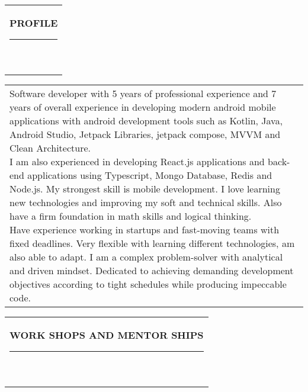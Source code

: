 \documentclass[10pt,A4]{article}
\newcommand{\mpwidth}{\linewidth-\fboxsep-\fboxsep}
\newcommand{\cvtext}[1] {
	\begin{tabular*}{1\mpwidth}{p{0.98\mpwidth}}
		\parbox{1\mpwidth}{#1}
	\end{tabular*}
}
\newcommand{\cvsection}[1] {
	\vspace{14pt}
	\cvtext{
		\textbf{\LARGE{\textcolor{darkcol}{\uppercase{#1}}}}\\[-4pt]
		\textcolor{maincol}{ \rule{0.1\textwidth}{2pt} } \\
	}
}
\begin{document}
\begin{paracol}{2}
\begin{rightcolumn}
\vfill\null
\cvsection{PROFILE}

\cvtext{Software developer with 5 years of professional experience and 7 years of overall experience in developing modern android mobile applications with android development tools such as Kotlin, Java, Android Studio, Jetpack Libraries, jetpack compose, MVVM and Clean Architecture. \\

I am also experienced in developing React.js applications and back-end applications using Typescript, Mongo Database, Redis and Node.js. My strongest skill is mobile development. I love learning new technologies and improving my soft and technical skills. Also have a ﬁrm foundation in math skills and logical thinking.\\

Have experience working in startups and fast-moving teams with ﬁxed deadlines. Very ﬂexible with learning different technologies, am also able to adapt. I am a complex problem-solver with analytical and driven mindset. Dedicated to achieving demanding development objectives according to tight schedules while producing impeccable code.\\

}

\vfill\null
\cvsection{WORK SHOPS AND MENTOR SHIPS}


\end{rightcolumn}
\end{paracol}
\end{document}
